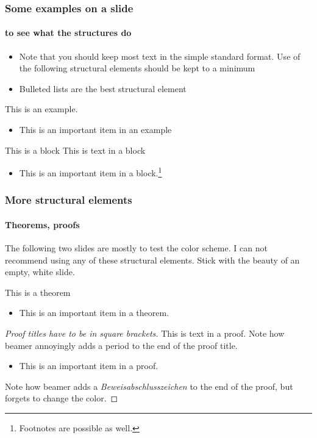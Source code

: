 \documentclass{beamer}
\begin{document}
\begin{frame}
\frametitle{Some examples on a slide}
\framesubtitle{to see what the structures do}

\begin{itemize}
	\item Note that you should keep most text in the simple standard format. Use of the following structural elements should be kept to a minimum
	\item Bulleted lists are the best structural element
\end{itemize}

\begin{example}
This is an example. 
\begin{itemize}
	\item This is an \alert{important} item in an example
\end{itemize}
\end{example}

\begin{block}{This is a block}
This is text in a block
\begin{itemize}
	\item This is an \alert{important} item in a block.\footnote{Footnotes are possible as well.}
\end{itemize}
\end{block}

\end{frame}

\begin{frame}
\frametitle{More structural elements}
\framesubtitle{Theorems, proofs}

The following two slides are mostly to test the color scheme. I can not recommend using any of these structural elements. Stick with the beauty of an empty, white slide.

\begin{theorem}{This is a theorem}
\begin{itemize}
	\item This is an \alert{important} item in a theorem.
\end{itemize}
\end{theorem}

\begin{proof}[Proof titles have to be in square brackets]
This is text in a proof. Note how beamer annoyingly adds a period to the end of the proof title.
\begin{itemize}
	\item This is an \alert{important} item in a proof.
\end{itemize}
Note how beamer adds a {\em Beweisabschlusszeichen} to the end of the proof, but forgets to change the color.
\end{proof}
\end{frame}
\end{document}
